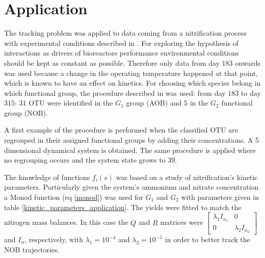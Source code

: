 \documentclass[3p,times]{article}
\begin{document}


\clearpage
\section{Application}
 

The tracking problem was applied to data coming from a nitrification process with experimental conditions described in \cite{dumont2008observers}. For exploring the hypothesis of interactions as drivers of bioreactors performance environmental conditions should be kept as constant as possible. Therefore only data from day $183$ onwards was used because a change in the operating temperature happened at that point, which is known to have an effect on kinetics. For choosing which species belong in which functional group, the procedure described in \cite{Ugalde-Salas2019} was used: from day $183$ to day $315$: 31 OTU were identified in the $G_1$ group (AOB) and 5 in the $G_2$ functional group (NOB). 




A first example of the procedure is performed when the classified OTU are regrouped in their assigned functional groups by adding their concentrations. A 5 dimensional dynamical system is obtained. The same procedure is applied where no regrouping occurs and the system state grows to 39. 

The knowledge of functions $f_i(s)$ was based on a study of nitrification's kinetic parameters\cite{Wiesmann1994}. Particularly given the system's ammonium and nitrate concentration a Monod function (eq \eqref{monod}) was used for $G_1$ and $G_2$ with parameters given in table \ref{kinetic_parameters_application}. The yields were fitted to match the nitrogen mass balances. In this case the $Q$ and $R$ matrices were $\begin{bmatrix}
\lambda_1 I_{n_1} &0  \\ 0& \lambda_2 I_{n_2}
\end{bmatrix}$ and $I_n$, respectively, with $\lambda_1 = 10^{-4}$ and $\lambda_2 = 10^{-5}$ in order to better track the NOB trajectories.
\end{document}
